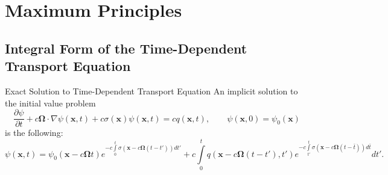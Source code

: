 \section{Maximum Principles}
\subsection{Integral Form of the Time-Dependent Transport Equation}
\begin{theorem}{Exact Solution to Time-Dependent Transport Equation}
   An implicit solution to the initial value problem
   \begin{equation}\label{PDE}
      \frac{\partial \psi}{\partial t} + c\mathbf{\Omega}\cdot\nabla\psi(\mathbf{x},t)
      + c\sigma(\mathbf{x})\psi(\mathbf{x},t) = c q(\mathbf{x},t),
      \qquad \psi(\mathbf{x},0) = \psi_0(\mathbf{x})
   \end{equation}
   is the following:
   \begin{equation}\label{exact}
      \psi(\mathbf{x},t) = \psi_0(\mathbf{x} - c\mathbf{\Omega}t)
         e^{-c\int\limits_0^t \sigma(\mathbf{x} - c\mathbf{\Omega}(t -t'))dt'} +
         c \int\limits_0^t q(\mathbf{x} - c\mathbf{\Omega}(t -t'),t')
         e^{-c\int\limits_{t'}^t\sigma(\mathbf{x}
         - c\mathbf{\Omega}(t -\bar{t}))d\bar{t}} dt'.
   \end{equation}
\end{theorem}

